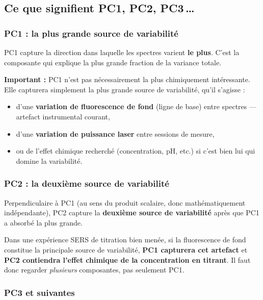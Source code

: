 \documentclass[12pt, a4paper]{article}
\begin{document}
\subsection{Ce que signifient PC1, PC2, PC3\,\ldots}

\subsubsection{PC1 : la plus grande source de variabilité}

PC1 capture la direction dans laquelle les spectres varient \textbf{le plus}.
C'est la composante qui explique la plus grande fraction de la variance totale.

\medskip

\textbf{Important :} PC1 n'est pas nécessairement la plus chimiquement
intéressante. Elle capturera simplement la plus grande source de variabilité,
qu'il s'agisse :
\begin{itemize}
  \item d'une \textbf{variation de fluorescence de fond} (ligne de base) entre
        spectres — artefact instrumental courant,
  \item d'une \textbf{variation de puissance laser} entre sessions de mesure,
  \item ou de l'effet chimique recherché (concentration, pH, etc.) si c'est
        bien lui qui domine la variabilité.
\end{itemize}

\subsubsection{PC2 : la deuxième source de variabilité}

Perpendiculaire à PC1 (au sens du produit scalaire, donc mathématiquement
indépendante), PC2 capture la \textbf{deuxième source de variabilité} après
que PC1 a \og absorbé\fg{} la plus grande.

\begin{attention}
Dans une expérience SERS de titration bien menée, si la fluorescence de fond
constitue la principale source de variabilité, \textbf{PC1 capturera cet
artefact} et \textbf{PC2 contiendra l'effet chimique de la concentration en
titrant}. Il faut donc regarder \emph{plusieurs} composantes, pas seulement
PC1.
\end{attention}

\subsubsection{PC3 et suivantes}
\end{document}
